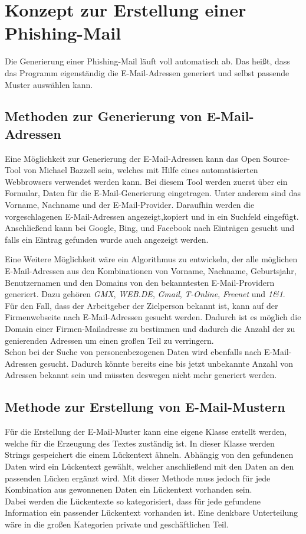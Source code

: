 \section{Konzept zur Erstellung einer Phishing-Mail}
Die Generierung einer Phishing-Mail läuft voll automatisch ab. Das heißt, dass das Programm eigenständig die E-Mail-Adressen generiert und selbst passende Muster auswählen kann.
	\subsection{Methoden zur Generierung von E-Mail-Adressen}
	Eine Möglichkeit zur Generierung der E-Mail-Adressen kann das Open Source-Tool von Michael Bazzell \cite{EmailAssumptions} sein, welches mit Hilfe eines automatisierten Webbrowsers verwendet werden kann. Bei diesem Tool werden zuerst über ein Formular, Daten für die E-Mail-Generierung eingetragen. Unter anderem sind das Vorname, Nachname und der E-Mail-Provider. Daraufhin werden die vorgeschlagenen E-Mail-Adressen angezeigt,kopiert und in ein Suchfeld eingefügt. Anschließend kann bei Google, Bing, und Facebook nach Einträgen gesucht und falls ein Eintrag gefunden wurde auch angezeigt werden.

	Eine Weitere Möglichkeit wäre ein Algorithmus zu entwickeln, der alle möglichen E-Mail-Adressen aus den Kombinationen von Vorname, Nachname, Geburtsjahr, Benutzernamen und den Domains von den bekanntesten E-Mail-Providern generiert. Dazu gehören \textit{GMX}, \textit{WEB.DE}, \textit{Gmail}, \textit{T-Online}, \textit{Freenet} und \textit{1\&1}.\cite{AnbieterMail} \\
	Für den Fall, dass der Arbeitgeber der Zielperson bekannt ist, kann auf der Firmenwebseite nach E-Mail-Adressen gesucht werden. Dadurch ist es möglich die Domain einer Firmen-Mailadresse zu bestimmen und dadurch die Anzahl der zu genierenden Adressen um einen großen Teil zu verringern.\\
	Schon bei der Suche von personenbezogenen Daten wird ebenfalls nach E-Mail-Adressen gesucht. Dadurch könnte bereits eine bis jetzt unbekannte Anzahl von Adressen bekannt sein und müssten deswegen nicht mehr generiert werden.


	\subsection{Methode zur Erstellung von E-Mail-Mustern}
	Für die Erstellung der E-Mail-Muster kann eine eigene Klasse erstellt werden, welche für die Erzeugung des Textes zuständig ist. In dieser Klasse werden Strings gespeichert die einem Lückentext ähneln. Abhängig von den gefundenen Daten wird ein Lückentext gewählt, welcher anschließend mit den Daten an den passenden Lücken ergänzt wird. Mit dieser Methode muss jedoch für jede Kombination aus gewonnenen Daten ein Lückentext vorhanden sein.\\
	Dabei werden die Lückentexte so kategorisiert, dass für jede gefundene Information ein passender Lückentext vorhanden ist. Eine denkbare Unterteilung wäre in die großen Kategorien private und geschäftlichen Teil.

